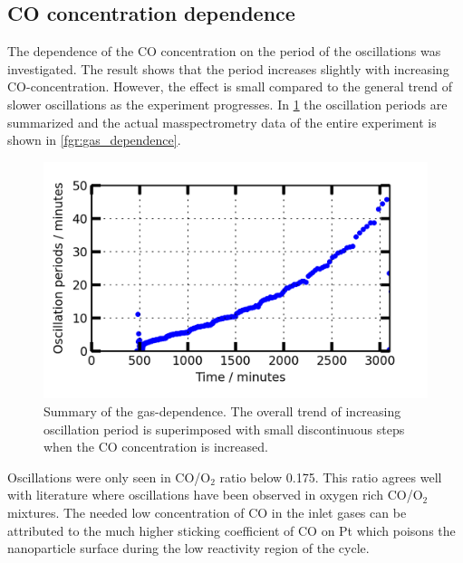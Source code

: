 \documentclass[journal=jacsat,manuscript=article]{achemso}
\begin{document}

\subsection{CO concentration dependence}
The dependence of the CO concentration on the period of the oscillations was
investigated. The result shows that the period increases slightly with
increasing CO-concentration. However, the effect is small compared to the
general trend of slower oscillations as the experiment progresses. In
\ref{fgr:gas_dependence_summary} the oscillation periods are summarized and the
actual masspectrometry data of the entire experiment is shown in
\ref{fgr:gas_dependence}.

\begin{figure}
  \includegraphics[width=12cm]{oscillations_gas_dependence_summary_supplemental.png}
  \caption{Summary of the gas-dependence. The overall trend of increasing
  oscillation period is superimposed with small discontinuous steps when the CO
  concentration is increased.} \label{fgr:gas_dependence_summary}
\end{figure}

Oscillations were only seen in CO/O$_2$ ratio below 0.175. This ratio agrees
well with literature \cite{Singh2010,Hendriksen2005} where oscillations have
been observed in oxygen rich CO/O$_2$ mixtures. The needed low concentration of
CO in the inlet gases can be attributed to the much higher sticking coefficient
of CO on Pt which poisons the nanoparticle surface during the low reactivity
region of the cycle.
\end{document}
